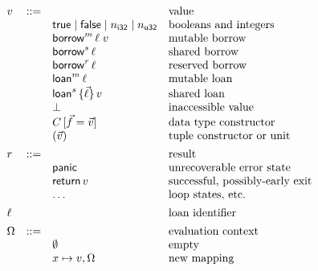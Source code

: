 \documentclass[acmsmall,screen]{acmart}
\newif\iflong
\newif\ifshort
\newcommand\kw[1]{\ensuremath{\mathsf{#1}}}
\newcommand\epanic{\kw{panic}}
\newcommand\ereturn{\kw{return}}
\newcommand\kfalse{\mathsf{false}}
\newcommand\ktrue{\mathsf{true}}
\newcommand\emborrow[2]{\ensuremath{\mathsf{borrow}^m\,#1\;#2}}
\newcommand\esborrow[1]{\ensuremath{\mathsf{borrow}^s\,#1}}
\newcommand\eiborrow[1]{\ensuremath{\mathsf{borrow}^r\,#1}}
\newcommand\esloan[2]{\ensuremath{\mathsf{loan}^s\,\{#1\}\,#2}}
\newcommand\emloan[1]{\ensuremath{\mathsf{loan}^m\,#1}}
\begin{document}
\begin{figure} %
    \smaller %
    \centering %
  \fi
    \ifshort
      \ruleline{\sffamily\textbf{Reduction}}
      \centering
      \arraycolsep=4pt
    \fi
    \[
    \ifshort
    \begin{array}{ll}
    \fi
    \begin{array}[t]{llll}
      v & ::= & & \text{value} \\
        && \ktrue \mid \kfalse \mid n_{\mathsf{i32}} \mid n_{\mathsf{u32}} \iflong\mid \ldots\quad\fi & \text{booleans and integers} \\
        && \emborrow \ell v & \text{mutable borrow} \\
        && \esborrow \ell & \text{shared borrow} \\
        && \eiborrow \ell & \text{reserved borrow} \\
        && \emloan \ell & \text{mutable loan} \\
        && \esloan {\vec\ell} v & \text{shared loan} \\
        && \bot & \text{inaccessible value} \\
        && C\,[ \vec f = \vec v ] & \text{data type constructor} \\
        && (\vec v) & \text{tuple constructor \iflong($\kw{len}(\vec v) > 1$) \fi or unit \iflong($\kw{len}(\vec v) = 0$)\fi}
      \\[1ex]

      r & ::= & & \text{result} \\
        && \epanic & \text{unrecoverable error state} \\
        && \ereturn\,v & \text{successful, possibly-early exit} \\
        && \ldots & \text{loop states, etc.}
      \\[1ex]

    \ifshort
    \end{array}
    &
    \begin{array}[t]{llll}
    \fi

      \ell & & & \text{loan identifier}
      \\[1ex]

      \Omega & ::= & & \text{evaluation context} \\
        && \emptyset & \text{empty} \\
        && x \mapsto v, \Omega & \text{new mapping} \\
    \end{array}
    \ifshort
    \end{array}
    \fi
    \]
    \ifshort
  \caption{The Low-Level Borrow Calculus: Syntax, Reduction Environments, Values}
    \fi
    \iflong
  \caption{The Low-Level Borrow Calculus: Reduction Environments, Values}
  \fi
  \label{fig:values}
    \ifshort
  \label{fig:syntax}
    \fi
\end{figure}
\end{document}
